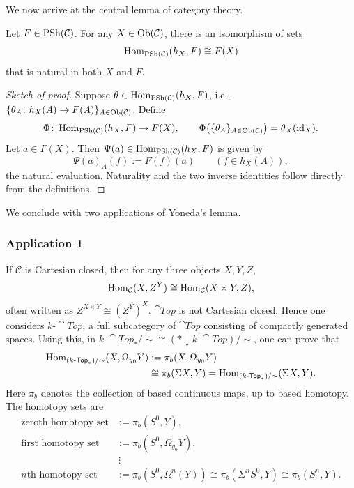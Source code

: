\documentclass[11pt,a4paper]{article}
\begin{document}
We now arrive at the central lemma of category theory.
\setcounter{theorem}{0}\begin{lemma}\label{lem:m1-yoneda}
Let $F\in\operatorname{PSh}(\mathcal C)$. For any $X\in\operatorname{Ob}(\mathcal C)$, there is an
isomorphism of sets
\[
 \operatorname{Hom}_{\operatorname{PSh}(\mathcal C)}(h_X,F)\cong F(X)
\]
that is natural in both $X$ and $F$.
\end{lemma}
\begin{proof}[Sketch of proof]
Suppose $\theta\in\operatorname{Hom}_{\operatorname{PSh}(\mathcal C)}(h_X,F)$, i.e.,
$\{\theta_A\colon h_X(A)\to F(A)\}_{A\in\operatorname{Ob}(\mathcal C)}$.
Define
\[
 \Phi\colon\operatorname{Hom}_{\operatorname{PSh}(\mathcal C)}(h_X,F)\to F(X),\qquad
 \Phi\bigl(\{\theta_A\}_{A\in\operatorname{Ob}(\mathcal C)}\bigr)=\theta_X(\operatorname{id}_X).
\]
Let $a\in F(X)$. Then $\Psi(a)\in\operatorname{Hom}_{\operatorname{PSh}(\mathcal C)}(h_X,F)$ is given by
\[
 \Psi(a)_A(f):=F(f)(a)\qquad(f\in h_X(A)),
\]
the natural evaluation. Naturality and the two inverse identities follow directly from the definitions.
\end{proof}
We conclude with two applications of Yoneda's lemma.
\subsubsection{Application 1}
If $\mathcal C$ is Cartesian closed, then for any three objects $X,Y,Z$,
\[
\operatorname{Hom}_{\mathcal C}(X,Z^Y)
 \cong\operatorname{Hom}_{\mathcal C}(X\times Y,Z),
\]
often written as $Z^{X\times Y}\cong(Z^Y)^X$.
$\cat{Top}$ is not Cartesian closed. Hence one considers
$k\text{-}\cat{Top}$, a full subcategory of $\cat{Top}$ consisting of
compactly generated spaces. Using this, in
$k\text{-}\cat{Top}_*/{\sim}\cong(*\downarrow k\text{-}\cat{Top})/{\sim}$,
one can prove that
\[
 \begin{aligned}
 \operatorname{Hom}_{(k\text{-}\mathsf{Top}_*)/{\sim}}(X,\Omega_{y_0}Y)
 &:=\pi_b(X,\Omega_{y_0}Y)\\
 &\cong\pi_b(\Sigma X,Y)
 =\operatorname{Hom}_{(k\text{-}\mathsf{Top}_*)/{\sim}}(\Sigma X,Y).
 \end{aligned}
\]
Here $\pi_b$ denotes the collection of based continuous maps, up to based homotopy.
The homotopy sets are
\[
 \begin{aligned}
 \text{zeroth homotopy set}&:=\pi_b(S^0,Y),\\
 \text{first homotopy set}&:=\pi_b(S^0,\Omega_{y_0}Y),\\
 &\ \vdots\\
 \text{$n$th homotopy set}&:=\pi_b(S^0,\Omega^n(Y))
 \cong\pi_b(\Sigma^nS^0,Y)\cong\pi_b(S^n,Y).
 \end{aligned}
\]
\end{document}
